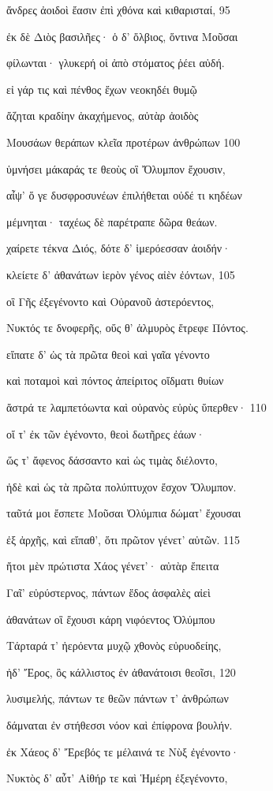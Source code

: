 ἄνδρες ἀοιδοὶ ἔασιν ἐπὶ χθόνα καὶ κιθαρισταί, 95

ἐκ δὲ Διὸς βασιλῆες· ὁ δ' ὄλβιος, ὅντινα Μοῦσαι

φίλωνται· γλυκερή οἱ ἀπὸ στόματος ῥέει αὐδή. 

εἰ γάρ τις καὶ πένθος ἔχων νεοκηδέι θυμῷ

ἄζηται κραδίην ἀκαχήμενος, αὐτὰρ ἀοιδὸς

Μουσάων θεράπων κλεῖα προτέρων ἀνθρώπων 100 

ὑμνήσει μάκαράς τε θεοὺς οἳ Ὄλυμπον ἔχουσιν, 

αἶψ' ὅ γε δυσφροσυνέων ἐπιλήθεται οὐδέ τι κηδέων

μέμνηται· ταχέως δὲ παρέτραπε δῶρα θεάων. 

χαίρετε τέκνα Διός, δότε δ' ἱμερόεσσαν ἀοιδήν· 

κλείετε δ' ἀθανάτων ἱερὸν γένος αἰὲν ἐόντων, 105

οἳ Γῆς ἐξεγένοντο καὶ Οὐρανοῦ ἀστερόεντος,

Νυκτός τε δνοφερῆς, οὕς θ' ἁλμυρὸς ἔτρεφε Πόντος.

εἴπατε δ' ὡς τὰ πρῶτα θεοὶ καὶ γαῖα γένοντο 

καὶ ποταμοὶ καὶ πόντος ἀπείριτος οἴδματι θυίων 

ἄστρά τε λαμπετόωντα καὶ οὐρανὸς εὐρὺς ὕπερθεν· 110 

οἵ τ' ἐκ τῶν ἐγένοντο, θεοὶ δωτῆρες ἐάων· 

ὥς τ' ἄφενος δάσσαντο καὶ ὡς τιμὰς διέλοντο, 

ἠδὲ καὶ ὡς τὰ πρῶτα πολύπτυχον ἔσχον Ὄλυμπον.

ταῦτά μοι ἔσπετε Μοῦσαι Ὀλύμπια δώματ' ἔχουσαι 

ἐξ ἀρχῆς, καὶ εἴπαθ', ὅτι πρῶτον γένετ' αὐτῶν. 115

ἤτοι μὲν πρώτιστα Χάος γένετ'· αὐτὰρ ἔπειτα

Γαῖ' εὐρύστερνος, πάντων ἕδος ἀσφαλὲς αἰεὶ

ἀθανάτων οἳ ἔχουσι κάρη νιφόεντος Ὀλύμπου 

Τάρταρά τ' ἠερόεντα μυχῷ χθονὸς εὐρυοδείης,

ἠδ' Ἔρος, ὃς κάλλιστος ἐν ἀθανάτοισι θεοῖσι, 120

λυσιμελής, πάντων τε θεῶν πάντων τ' ἀνθρώπων

δάμναται ἐν στήθεσσι νόον καὶ ἐπίφρονα βουλήν.

ἐκ Χάεος δ' Ἔρεβός τε μέλαινά τε Νὺξ ἐγένοντο· 

Νυκτὸς δ' αὖτ' Αἰθήρ τε καὶ Ἡμέρη ἐξεγένοντο,

